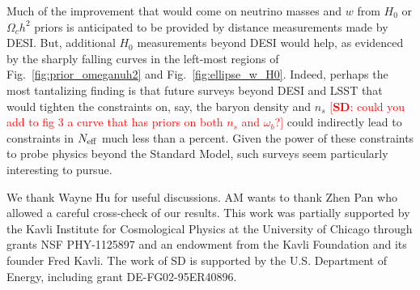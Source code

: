 \documentclass[aps,prd,reprint,superscriptaddress]{revtex4-1}
\newcommand{\sd}[1]{\textcolor{red}{[{\bf SD}: #1]}}
\newcommand{\reffig}[1]{Fig.~\ref{fig:#1}}
\begin{document}
Much of the improvement that would come on neutrino masses and $w$ from $H_0$ or $\Omega_ch^2$ priors is anticipated to be provided by distance measurements made by DESI. But, additional $H_0$ measurements beyond DESI would help, as evidenced by the sharply falling curves in the left-most regions of \reffig{prior_omeganuh2} and \reffig{ellipse_w_H0}. Indeed, perhaps the most tantalizing finding is that future surveys beyond DESI and LSST that would tighten the constraints on, say, the baryon density and $n_s$ \sd{could you add to fig 3 a curve that has priors on both $n_s$ and $\omega_b$?} could indirectly lead to constraints in $N_{\rm eff}$ much less than a percent. Given the power of these constraints to probe physics beyond the Standard Model, such surveys seem particularly interesting to pursue.


\begin{acknowledgments}
We thank Wayne Hu for useful discussions. AM wants to thank Zhen Pan who allowed a careful cross-check of our results.
This work was partially supported by the Kavli Institute for Cosmological Physics at the University of Chicago through grants NSF PHY-1125897 and an endowment from the Kavli Foundation and its founder Fred Kavli.
The work of SD is supported by the U.S. Department of Energy, including grant DE-FG02-95ER40896.
\end{acknowledgments}


\end{document}
